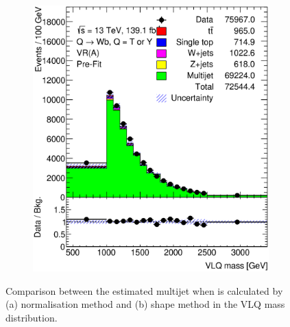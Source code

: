 \begin{figure}[hbt!]
\begin{subfigure}{.35\textwidth}
		\includegraphics[width=\linewidth,height=\textheight,keepaspectratio]{figs/chapter5/prefitbinbybin/VR_B_VLQM.eps}
		\caption{}
		\label{fig:abcd:correctionfactor:bin:VLQM}
	\end{subfigure}
	\caption{Comparison between the estimated multijet when \R is calculated by (a) normalisation method and (b) shape method in the VLQ mass distribution.}
	\label{fig:abcd:correctionfactor:VLQM}
\end{figure}


